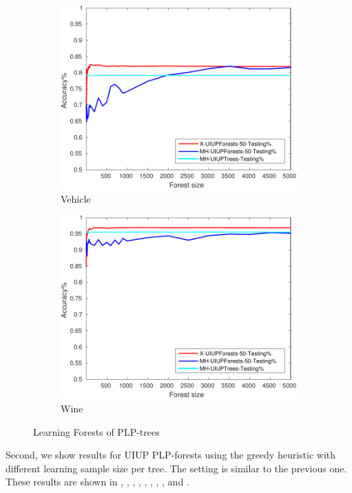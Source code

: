 \begin{figure}[ht]
\begin{subfigure}[b]{0.3\textwidth}
  	\includegraphics[width=\textwidth]{figs/PLPTF/Forests/VehicleDownsampledFurther_Forests_X_MH.pdf}
  	\caption{Vehicle}
		\label{fig:V3}
	\end{subfigure}
  \begin{subfigure}[b]{0.3\textwidth}
		\centering
  	\includegraphics[width=\textwidth]{figs/PLPTF/Forests/WineDownsampled_Forests_X_MH.pdf}
  	\caption{Wine}
		\label{fig:W3}
	\end{subfigure}

  \caption{Learning Forests of PLP-trees}
  \label{fig:forests1}
\end{figure}

Second, we show results for UIUP PLP-forests using the greedy
heuristic with different learning sample size per tree.
The setting is similar to the previous one.
These results are shown in , , , ,
, , , , and .

